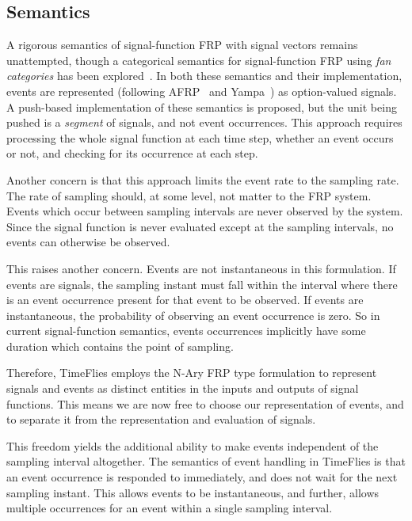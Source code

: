 \subsection{Semantics}
\label{subsection:System_Design_and_Interface-Semantics}

A rigorous semantics of signal-function FRP with signal vectors remains
unattempted, though a categorical semantics for signal-function FRP using
{\em fan categories} has been explored~\cite{Jeffrey2012}. In both these
semantics and their implementation, events are represented (following
AFRP~\cite{Courtney2001-1} and Yampa~\cite{Nilsson2005}) as option-valued
signals. A push-based implementation of these semantics is proposed, but the
unit being pushed is a {\em segment} of signals, and not event occurrences. This
approach requires processing the whole signal function at each time step,
whether an event occurs or not, and checking for its occurrence at each step.

Another concern is that this approach limits the event rate to the sampling rate.
The rate of sampling should, at some level, not matter to the FRP system. Events
which occur between sampling intervals are never observed by the
system. Since the signal function is never evaluated except at the sampling
intervals, no events can otherwise be observed.

This raises another concern. Events are not instantaneous in this
formulation. If events are signals, the sampling instant must fall within
the interval where there is an event occurrence present for that event to be
observed. If events are instantaneous, the probability of observing an event 
occurrence is zero. So in current signal-function semantics, events occurrences
implicitly have some duration which contains the point of sampling.

Therefore, TimeFlies employs the N-Ary FRP type formulation to represent signals and
events as distinct entities in the inputs and outputs of signal functions. This means
we are now free to choose our representation of events, and to separate it from the
representation and evaluation of signals.

This freedom yields the additional ability to make events independent of the
sampling interval altogether. The semantics of event handling in TimeFlies is
that an event occurrence is responded to immediately, and does not wait for the
next sampling instant. This allows events to be instantaneous, and further,
allows multiple occurrences for an event within a single sampling interval.

